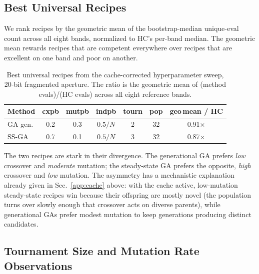 \subsection{Best Universal Recipes}

We rank recipes by the geometric mean of the bootstrap-median
unique-eval count across all eight bands, normalized to HC's
per-band median. The geometric mean rewards recipes that are
competent everywhere over recipes that are excellent on one band
and poor on another.

\begin{table}[h]
\centering
\caption[Best universal recipes from the 20-bit hyperparameter sweep]{Best universal recipes from the cache-corrected
hyperparameter sweep, 20-bit fragmented aperture. The ratio is the
geometric mean of (method evals)/(HC evals) across all eight
reference bands.}
\label{tab:best_recipes}
\small
\begin{tabular}{lcccccc}
\hline
Method & cxpb & mutpb & indpb & tourn & pop & geo\,mean / HC \\
\hline
GA gen.   & 0.2 & 0.3 & $0.5/N$ & 2 & 32 & 0.91$\times$ \\
SS-GA     & 0.7 & 0.1 & $0.5/N$ & 3 & 32 & 0.87$\times$ \\
\hline
\end{tabular}
\end{table}

The two recipes are stark in their divergence. The generational GA
prefers \emph{low} crossover and \emph{moderate} mutation; the
steady-state GA prefers the opposite, \emph{high} crossover and
\emph{low} mutation. The asymmetry has a mechanistic explanation
already given in Sec.~\ref{app:cache} above: with
the cache active, low-mutation steady-state recipes win because
their offspring are mostly novel (the population turns over slowly
enough that crossover acts on diverse parents), while generational
GAs prefer modest mutation to keep generations producing distinct
candidates.

\subsection{Tournament Size and Mutation Rate Observations}

